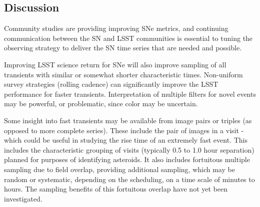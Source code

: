 
\subsection{Discussion}
\label{sec:keyword:discussion}

Community studies are providing improving SNe metrics, and continuing communication between the SN and LSST communities is essential to tuning the observing strategy to deliver the SN time series that are needed and possible.

Improving LSST science return for SNe will also improve sampling of all transients with similar or somewhat shorter characteristic times.  Non-uniform survey strategies (rolling cadence) can significantly improve the LSST performance for faster transients.  Interpretation of multiple filters for novel events may be powerful, or problematic, since color may be uncertain.  

Some insight into fast transients may be available from image pairs  or triples (as opposed to more complete series).  These include the pair of images in a visit - which could be useful in studying the rise time of an extremely fast event.  This includes the characteristic grouping of visits (typically 0.5 to 1.0 hour separation) planned for purposes of identifying asteroids.  It also includes fortuitous multiple sampling due to field overlap, providing additional sampling, which may be random or systematic, depending on the scheduling, on a time scale of minutes to hours.  The sampling benefits of this fortuitous overlap have not yet been investigated.





